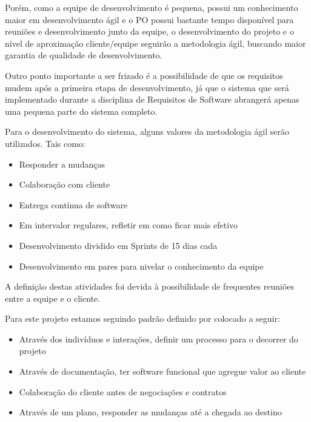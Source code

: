 Porém, como a equipe de desenvolvimento é pequena, possui um conhecimento maior em desenvolvimento ágil e o PO possui bastante tempo disponível para reuniões e desenvolvimento junto da equipe, o desenvolvimento do projeto e o nível de aproximação cliente/equipe seguirão a metodologia ágil, buscando maior garantia de qualidade de desenvolvimento.

Outro ponto importante a ser frizado é a possibilidade de que os requisitos mudem após a primeira etapa de desenvolvimento, já que o sistema que será implementado durante a disciplina de Requisitos de Software abrangerá apenas uma pequena parte do sistema completo. 
    
Para o desenvolvimento do sistema, alguns valores da metodologia ágil serão utilizados. Tais como:

\begin{itemize}
    \item{Responder a mudanças}
    \item{Colaboração com cliente}
    \item{Entrega contínua de software}
    \item{Em intervalor regulares, refletir em como ficar mais efetivo}
    \item{Desenvolvimento dividido em Sprints de 15 dias cada}
    \item{Desenvolvimento em pares para nivelar o conhecimento da equipe}
\end{itemize}

A definição destas atividades foi devida à possibilidade de frequentes reuniões entre a equipe e o cliente. 

Para este projeto estamos seguindo padrão definido por \cite{cho2009hybrid} colocado a seguir:

\begin{itemize}
    \item{Através dos indivíduos e interações, definir um processo para o decorrer do projeto}
    \item{Através de documentação, ter software funcional que agregue valor ao cliente}
    \item{Colaboração do cliente antes de negociações e contratos}
    \item{Através de um plano, responder as mudanças até a chegada ao destino}
\end{itemize}
